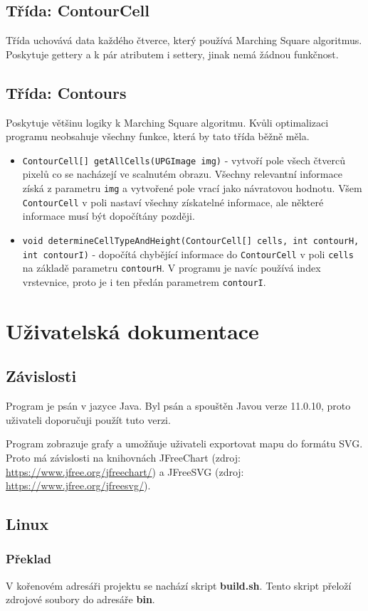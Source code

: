 \documentclass[12pt]{report}
\begin{document}
\subsection{Třída: ContourCell}
Třída uchovává data každého čtverce, který používá Marching Square algoritmus. Poskytuje gettery a k pár
atributem i settery, jinak nemá žádnou funkčnost.
%
\subsection{Třída: Contours}
Poskytuje většinu logiky k Marching Square algoritmu. Kvůli optimalizaci programu neobsahuje všechny funkce,
která by tato třída běžně měla.

\begin{itemize}
  \item \texttt{ContourCell[] getAllCells(UPGImage img)} - vytvoří pole všech čtverců pixelů co se nacházejí
  	ve scalnutém obrazu. Všechny relevantní informace získá z parametru \texttt{img} a vytvořené pole vrací
	jako návratovou hodnotu. Všem \texttt{ContourCell} v poli nastaví všechny získatelné informace, ale některé
	informace musí být dopočítány později.
  \item \texttt{void determineCellTypeAndHeight(ContourCell[] cells, int contourH, int contourI)} - dopočítá
  	chybějící informace do \texttt{ContourCell} v poli \texttt{cells} na základě parametru \texttt{contourH}.
	V programu je navíc používá index vrstevnice, proto je i ten předán parametrem \texttt{contourI}.
\end{itemize}
%
\section{Uživatelská dokumentace}
\subsection{Závislosti}
Program je psán v jazyce Java. Byl psán a spouštěn Javou verze 11.0.10, proto uživateli doporučuji
použít tuto verzi.

Program zobrazuje grafy a umožňuje uživateli exportovat mapu do formátu SVG. Proto má závislosti na 
knihovnách JFreeChart (zdroj: \url{https://www.jfree.org/jfreechart/}) a
JFreeSVG (zdroj: \url{https://www.jfree.org/jfreesvg/}).
%
\subsection{Linux}
\subsubsection{Překlad}
V kořenovém adresáři projektu se nachází skript \textbf{build.sh}. Tento skript přeloží zdrojové soubory
do adresáře \textbf{bin}.
\end{document}
